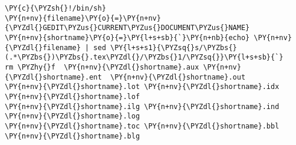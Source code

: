 \begin{Verbatim}[commandchars=\\\{\}]
\PY{c}{\PYZsh{}!/bin/sh}
\PY{n+nv}{filename}\PY{o}{=}\PY{n+nv}{\PYZdl{}GEDIT\PYZus{}CURRENT\PYZus{}DOCUMENT\PYZus{}NAME}
\PY{n+nv}{shortname}\PY{o}{=}\PY{l+s+sb}{`}\PY{n+nb}{echo} \PY{n+nv}{\PYZdl{}filename} | sed \PY{l+s+s1}{\PYZsq{}s/\PYZbs{}(.*\PYZbs{})\PYZbs{}.tex\PYZdl{}/\PYZbs{}1/\PYZsq{}}\PY{l+s+sb}{`}
rm \PYZhy{}f  \PY{n+nv}{\PYZdl{}shortname}.aux \PY{n+nv}{\PYZdl{}shortname}.ent  \PY{n+nv}{\PYZdl{}shortname}.out
\PY{n+nv}{\PYZdl{}shortname}.lot \PY{n+nv}{\PYZdl{}shortname}.idx \PY{n+nv}{\PYZdl{}shortname}.lof
\PY{n+nv}{\PYZdl{}shortname}.ilg \PY{n+nv}{\PYZdl{}shortname}.ind \PY{n+nv}{\PYZdl{}shortname}.log
\PY{n+nv}{\PYZdl{}shortname}.toc \PY{n+nv}{\PYZdl{}shortname}.bbl \PY{n+nv}{\PYZdl{}shortname}.blg
\end{Verbatim}
